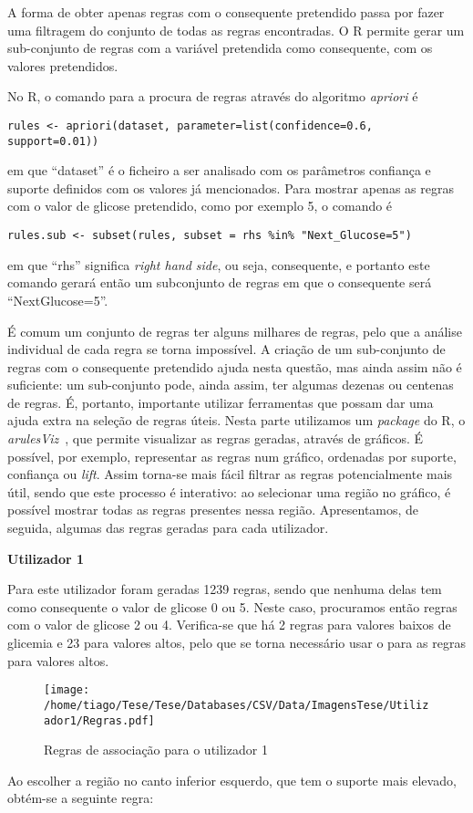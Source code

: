 A forma de obter apenas regras com o consequente pretendido passa por fazer uma filtragem do conjunto de todas as regras encontradas. O R permite gerar um sub-conjunto de regras com a variável pretendida como consequente, com os valores pretendidos.


No R, o comando para a procura de regras através do algoritmo \textit{apriori} é

\begin{lstlisting}
rules <- apriori(dataset, parameter=list(confidence=0.6, support=0.01))
\end{lstlisting}
em que ``dataset'' é o ficheiro a ser analisado com os parâmetros confiança e suporte definidos com os valores já mencionados. Para mostrar apenas as regras com o valor de glicose pretendido, como por exemplo 5, o comando é

\begin{lstlisting}
rules.sub <- subset(rules, subset = rhs %in% "Next_Glucose=5")
\end{lstlisting}
em que ``rhs'' significa \textit{right hand side}, ou seja, consequente, e portanto este comando gerará então um subconjunto de regras em que o consequente será ``Next\textunderscore Glucose=5''.

É comum um conjunto de regras ter alguns milhares de regras, pelo que a análise individual de cada regra se torna impossível. A criação de um sub-conjunto de regras com o consequente pretendido ajuda nesta questão, mas ainda assim não é suficiente: um sub-conjunto pode, ainda assim, ter algumas dezenas ou centenas de regras. É, portanto, importante utilizar ferramentas que possam dar uma ajuda extra na seleção de regras úteis. Nesta parte utilizamos um \textit{package} do R, o \textit{arulesViz}~\cite{arulesviz}, que permite visualizar as regras geradas, através de gráficos. É possível, por exemplo, representar as regras num gráfico, ordenadas por suporte, confiança ou \textit{lift}. Assim torna-se mais fácil filtrar as regras potencialmente mais útil, sendo que este processo é interativo: ao selecionar uma região no gráfico, é possível mostrar todas as regras presentes nessa região. 
Apresentamos, de seguida, algumas das regras geradas para cada utilizador.

\textbf{Utilizador 1}

Para este utilizador foram geradas 1239 regras, sendo que nenhuma delas tem como consequente o valor de glicose 0 ou 5. Neste caso, procuramos então regras com o valor de glicose 2 ou 4. Verifica-se que há 2 regras para valores baixos de glicemia e 23 para valores altos, pelo que se torna necessário usar o  para as regras para valores altos. 
\begin{figure}[H]
\centering
\texttt{[image: /home/tiago/Tese/Tese/Databases/CSV/Data/ImagensTese/Utilizador1/Regras.pdf]}
\caption{Regras de associação para o utilizador 1}
\end{figure}
Ao escolher a região no canto inferior esquerdo, que tem o suporte mais elevado, obtém-se a seguinte regra:

